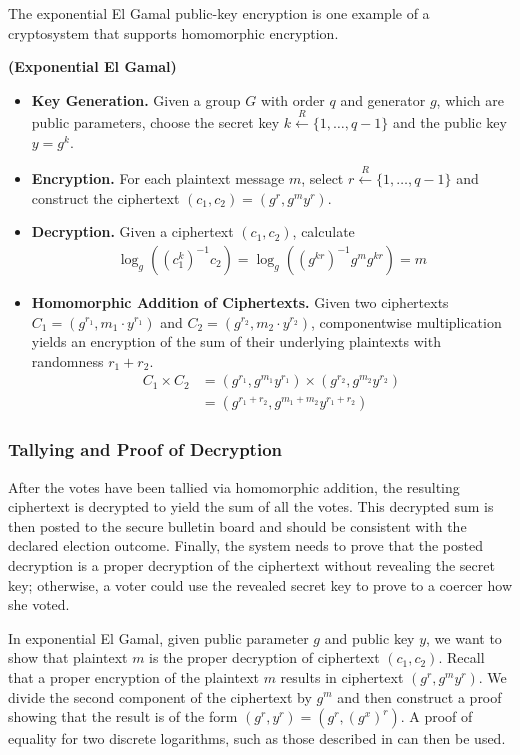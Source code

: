 The exponential El Gamal public-key encryption \cite{elgamal} is one example of a cryptosystem that supports homomorphic encryption.
\begin{definition}
\textbf{(Exponential El Gamal)}
\begin{itemize}
\item \textbf{Key Generation.} Given a group $G$ with order $q$ and generator $g$, which are public parameters, choose the secret key $k \xleftarrow{R} \{1, \dotsc, q-1\}$ and the public key $y = g^k$.
\item \textbf{Encryption.} For each plaintext message $m$, select $r \xleftarrow{R} \{1, \dotsc, q-1\}$ and construct the ciphertext $(c_1, c_2) = (g^r, g^m y^r)$.
\item \textbf{Decryption.} Given a ciphertext $(c_1, c_2)$, calculate
\begin{align*}
\log_g\left((c_1^k)^{-1} c_2\right) = \log_g\left((g^{kr})^{-1} g^m g^{kr}\right) = m
\end{align*}
\item \textbf{Homomorphic Addition of Ciphertexts.} Given two ciphertexts $C_1 = (g^{r_1}, m_1 \cdot y^{r_1})$ and $C_2 = (g^{r_2}, m_2 \cdot y^{r_2})$, componentwise multiplication yields an encryption of the sum of their underlying plaintexts with randomness $r_1 + r_2$.
\begin{align*}
C_1 \times C_2 &= (g^{r_1}, g^{m_1} y^{r_1}) \times (g^{r_2}, g^{m_2} y^{r_2}) \\
&= (g^{r_1 + r_2}, g^{m_1 + m_2} y^{r_1 + r_2})
\end{align*}
\end{itemize}
\end{definition}

\subsubsection{Tallying and Proof of Decryption}

After the votes have been tallied via homomorphic addition, the resulting ciphertext is decrypted to yield the sum of all the votes. This decrypted sum is then posted to the secure bulletin board and should be consistent with the declared election outcome. Finally, the system needs to prove that the posted decryption is a proper decryption of the ciphertext without revealing the secret key; otherwise, a voter could use the revealed secret key to prove to a coercer how she voted.

In exponential El Gamal, given public parameter $g$ and public key $y$, we want to show that plaintext $m$ is the proper decryption of ciphertext $(c_1, c_2)$. Recall that a proper encryption of the plaintext $m$ results in ciphertext $(g^r, g^m y^r)$. We divide the second component of the ciphertext by $g^m$ and then construct a proof showing that the result is of the form $(g^r, y^r) = (g^r, (g^x)^r)$. A proof of equality for two discrete logarithms, such as those described in \cite{chaum-pedersen} can then be used.


